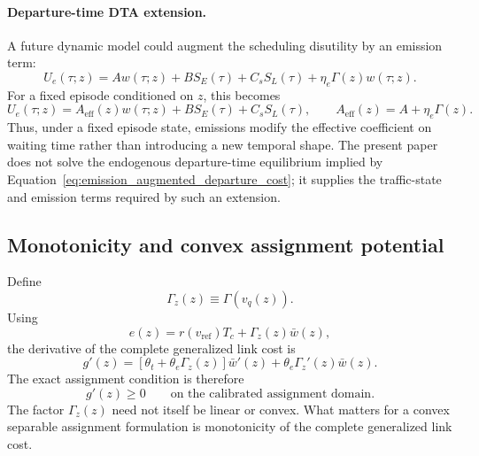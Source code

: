 \paragraph{Departure-time DTA extension.}
A future dynamic model could augment the scheduling disutility by an
emission term:
\begin{equation}
\label{eq:emission_augmented_departure_cost}
U_e(\tau;z)
=
A w(\tau;z)
+
B S_E(\tau)
+
C_s S_L(\tau)
+
\eta_e\Gamma(z)w(\tau;z).
\end{equation}
For a fixed episode conditioned on $z$, this becomes
\begin{equation}
\label{eq:effective_waiting_coefficient}
U_e(\tau;z)
=
A_{\mathrm{eff}}(z)w(\tau;z)
+
B S_E(\tau)
+
C_s S_L(\tau),
\qquad
A_{\mathrm{eff}}(z)
=
A+\eta_e\Gamma(z).
\end{equation}
Thus, under a fixed episode state, emissions modify the effective coefficient
on waiting time rather than introducing a new temporal shape. The present
paper does not solve the endogenous departure-time equilibrium implied by
Equation~\eqref{eq:emission_augmented_departure_cost}; it supplies the
traffic-state and emission terms required by such an extension.



\subsection{Monotonicity and convex assignment potential}

Define
\begin{equation}
\Gamma_z(z)
\equiv
\Gamma(v_q(z)).
\end{equation}
Using
\begin{equation}
e(z)
=
r(v_{\mathrm{ref}})T_c
+
\Gamma_z(z)\bar w(z),
\end{equation}
the derivative of the complete generalized link cost is
\begin{equation}
\label{eq:exact_generalized_cost_derivative}
g'(z)
=
\left[
\theta_t+\theta_e\Gamma_z(z)
\right]\bar w'(z)
+
\theta_e\Gamma_z'(z)\bar w(z).
\end{equation}
The exact assignment condition is therefore
\begin{equation}
\label{eq:exact_monotonicity}
g'(z)\geq0
\qquad
\text{on the calibrated assignment domain}.
\end{equation}
The factor $\Gamma_z(z)$ need not itself be linear or convex. What matters
for a convex separable assignment formulation is monotonicity of the complete
generalized link cost.

